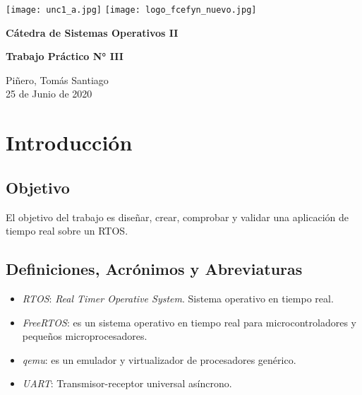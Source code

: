 \documentclass[12pt,a4paper]{article}
\renewcommand{\baselinestretch}{1} %
\begin{document}
\begin{titlepage}
    \begin{center}
      \vspace*{1cm}

      \vspace{2cm}
      \texttt{[image: unc1\_a.jpg]}
      \texttt{[image: logo\_fcefyn\_nuevo.jpg]}

      \Huge
      \textbf{Cátedra de Sistemas Operativos II}

      \vspace{3.5cm}

      \textbf{Trabajo Práctico N\si{\degree} III}

      \vfill

      \vspace{0.8cm}



      \Large
      Piñero, Tomás Santiago\\
      25 de Junio de 2020
    \end{center}
\end{titlepage}

\setcounter{secnumdepth}{3}
\setcounter{tocdepth}{5}
\tableofcontents


\newpage
\renewcommand{\baselinestretch}{1}
\setlength{\parskip}{0.5em}

\section{Introducción}
\label{intro}

\subsection{Objetivo}
\label{objetivo}
El objetivo del trabajo es diseñar, crear, comprobar y validar una
aplicación de tiempo real sobre un RTOS.


\subsection{Definiciones, Acrónimos y Abreviaturas}
\label{daa}

\begin{itemize}
  \item \emph{RTOS}: \emph{Real Timer Operative System}. Sistema operativo en
  tiempo real.
  \item \emph{FreeRTOS}: es un sistema operativo en tiempo real para
  microcontroladores y pequeños microprocesadores.
  \cite{freertos}
  \item \emph{qemu}: es un emulador y virtualizador de procesadores genérico.
  \cite{qemu}
  \item \emph{UART}: Transmisor-receptor universal asíncrono.
\end{itemize}
\end{document}
